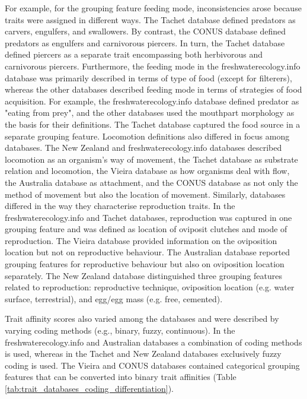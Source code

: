 \documentclass[12pt]{article}
\begin{document}
For example, for the grouping feature feeding mode, inconsistencies arose because traits were assigned in different ways. The Tachet database defined predators as carvers, engulfers, and swallowers. By contrast, the CONUS database defined predators as engulfers and carnivorous piercers. In turn, the Tachet database defined piercers as a separate trait encompassing both herbivorous and carnivorous piercers. Furthermore, the feeding mode in the freshwaterecology.info database was primarily described in terms of type of food (except for filterers), whereas the other databases described feeding mode in terms of strategies of food acquisition. For example, the freshwaterecology.info database defined predator as "eating from prey", and the other databases used the mouthpart morphology as the basis for their definitions. The Tachet database captured the food source in a separate grouping feature. Locomotion definitions also differed in focus among databases. The New Zealand and freshwaterecology.info databases described locomotion as an organism’s way of movement, the Tachet database as substrate relation and locomotion, the Vieira database as how organisms deal with flow, the Australia database as attachment, and the CONUS database as not only the method of movement but also the location of movement. Similarly, databases differed in the way they characterise reproduction traits. In the freshwaterecology.info and Tachet databases, reproduction was captured in one grouping feature and was defined as location of oviposit clutches and mode of reproduction. The Vieira database provided information on the oviposition location but not on reproductive behaviour. The Australian database reported grouping features for reproductive behaviour but also on oviposition location separately. The New Zealand database distinguished three grouping features related to reproduction: reproductive technique, oviposition location (e.g. water surface, terrestrial), and egg/egg mass (e.g. free, cemented).

Trait affinity scores also varied among the databases and were described by varying coding methods (e.g., binary, fuzzy, continuous). In the freshwaterecology.info and Australian databases a combination of coding methods is used, whereas in the Tachet and New Zealand databases exclusively fuzzy coding is used. The Vieira and CONUS databases contained categorical grouping features that can be converted into binary trait affinities (Table \ref{tab:trait_databases_coding_differentiation}).

\end{document}
